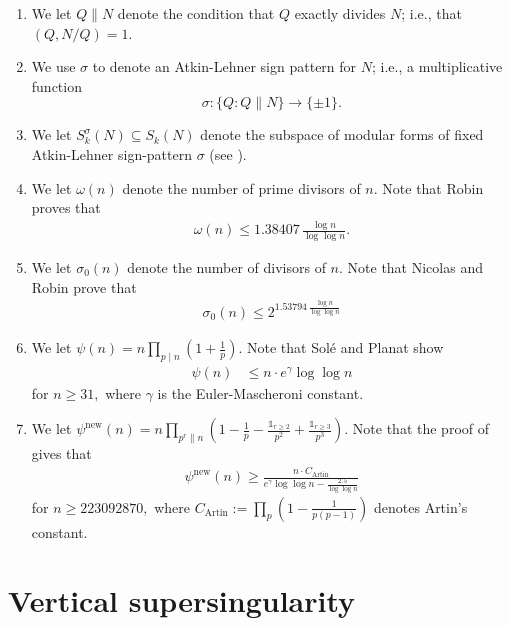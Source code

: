 \documentclass[11pt,letterpaper,reqno]{amsart}
\theoremstyle{definition}
\numberwithin{equation}{section}
\numberwithin{figure}{section}
\numberwithin{table}{section}
\newcommand{\lrp}[1]{\!\left(#1\right)}
\newcommand{\nw}{\mathrm{new}}
\begin{document}
\begin{enumerate}
    \item We let $Q \| N$ denote the condition that $Q$ exactly divides $N$; i.e., that $(Q, N/Q) = 1.$
    \item We use $\sigma$ to denote an Atkin-Lehner sign pattern for $N$; i.e., a multiplicative function
    $$\sigma : \{ Q : Q \| N \} \longrightarrow \{ \pm 1 \}.$$
    \item We let $S_k^{\sigma}(N) \subseteq S_k(N)$ denote the subspace of modular forms of fixed Atkin-Lehner sign-pattern $\sigma$ (see \cite[\S1.2]{KMRX}).
    \item We let $\omega(n)$ denote the number of prime divisors of $n.$ Note that Robin \cite[Th\'eor\`eme 11]{Rob83} proves that
    \begin{align}
        \omega(n) \leq 1.38407 \, \frac{\log n}{\log \log n}. \label{eqn:robin-omega-bound}
    \end{align}
    \item We let $\sigma_0(n)$ denote the number of divisors of $n.$ Note that Nicolas and Robin \cite[Th\'eor\`eme 1]{NR83} prove that
    \begin{align}
        \sigma_0(n) \leq 2^{1.53794 \, \frac{\log n}{\log \log n}} \label{eqn:nicolas-robin-sigma-bound}
    \end{align}
    \item We let $\psi(n) = n \prod_{p \mid n} \left(1 + \frac{1}{p} \right).$ Note that Sol\'e and Planat \cite[Corollary 2]{sole2011extreme} show
    \begin{align}
        \psi(n) &\leq n \cdot e^\gamma \log   \log n \label{eqn:Sole-Planat-psi-bound}
    \end{align}
    for $n \geq 31,$ where $\gamma$ is the Euler-Mascheroni constant.
    \item We let $\psi^\nw(n) = n \prod_{p^r \| n} \left( 1 - \frac{1}{p} - \frac{\mathds{1}_{r \geq 2}}{p^2} + \frac{\mathds{1}_{r \geq 3}}{p^3} \right).$ Note that the proof of \cite[Lemma 3.6]{KMRX} gives that
    \begin{align}
        \psi^{\nw}(n) \geq \frac{n \cdot C_{\text{Artin}}}{e^{\gamma} \log \log n - \frac{2.5}{\log \log n}} \label{eqn:bound-on-psi-new}
    \end{align}
    for $n \geq 223092870,$ where $C_{\text{Artin}} := \prod_p \lrp{1 - \frac{1}{p(p-1)}}$ denotes Artin's constant.
\end{enumerate}


\section{Vertical supersingularity}\label{section:vertical}
\end{document}
